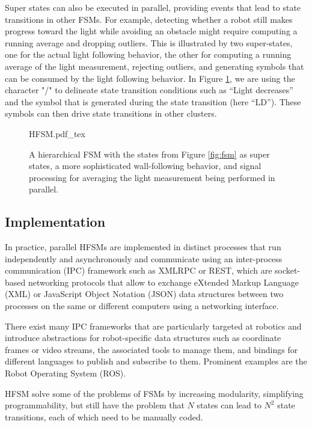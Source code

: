 Super states can also be executed in parallel, providing events that lead to state transitions in other FSMs. For example, detecting whether a robot still makes progress toward the light while avoiding an obstacle might require computing a running average and dropping outliers. This is illustrated by two super-states, one for the actual light following behavior, the other for computing a running average of the light measurement, rejecting outliers, and generating symbols that can be consumed by the light following behavior. In Figure \ref{fig:hfsm}, we are using the character "/" to delineate state transition conditions such as ``Light decreases'' and the symbol that is generated during the state transition (here ``LD''). These symbols can then drive state transitions in other clusters.

\begin{figure}
\centering
    \tiny
    \def\svgwidth{1.0\textwidth}
    {HFSM.pdf_tex}
\caption{A hierarchical FSM with the states from Figure \ref{fig:fsm} as super states, a more sophisticated wall-following behavior, and signal processing for averaging the light measurement being performed in parallel. \label{fig:hfsm}}
\end{figure}

\subsection{Implementation}
In practice, parallel HFSMs are implemented in distinct processes that run independently and asynchronously and communicate using an inter-process communication (IPC) framework  such as XMLRPC or REST, which are socket-based networking protocols that allow to exchange eXtended Markup Language (XML) or JavaScript Object Notation (JSON) data structures between two processes on the same or different computers using a networking interface.

There exist many IPC frameworks that are particularly targeted at robotics and introduce abstractions for robot-specific data structures such as coordinate frames or video streams, the associated tools to manage them, and bindings for different languages to publish and subscribe to them. Prominent examples are the Robot Operating System (ROS).


HFSM solve some of the problems of FSMs by increasing modularity, simplifying programmability, but still have the problem that $N$ states can lead to $N^2$ state transitions, each of which need to be manually coded.

